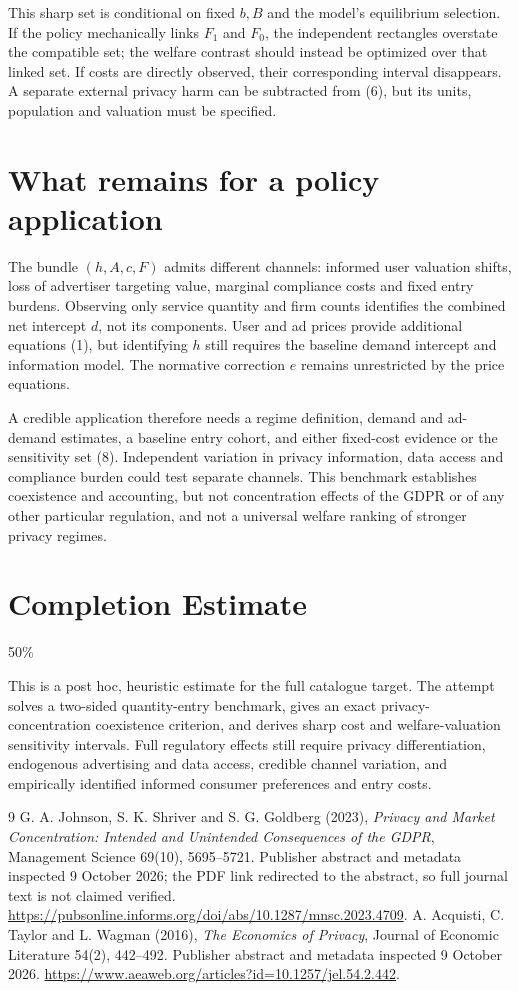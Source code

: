 \documentclass[11pt]{article}
\theoremstyle{remark}
\begin{document}
This sharp set is conditional on fixed $b,B$ and the model's equilibrium selection. If the policy mechanically links $F_1$ and $F_0$, the independent rectangles overstate the compatible set; the welfare contrast should instead be optimized over that linked set. If costs are directly observed, their corresponding interval disappears. A separate external privacy harm can be subtracted from (6), but its units, population and valuation must be specified.

\section{What remains for a policy application}
The bundle $(h,A,c,F)$ admits different channels: informed user valuation shifts, loss of advertiser targeting value, marginal compliance costs and fixed entry burdens. Observing only service quantity and firm counts identifies the combined net intercept $d$, not its components. User and ad prices provide additional equations (1), but identifying $h$ still requires the baseline demand intercept and information model. The normative correction $e$ remains unrestricted by the price equations.

A credible application therefore needs a regime definition, demand and ad-demand estimates, a baseline entry cohort, and either fixed-cost evidence or the sensitivity set (8). Independent variation in privacy information, data access and compliance burden could test separate channels. This benchmark establishes coexistence and accounting, but not concentration effects of the GDPR or of any other particular regulation, and not a universal welfare ranking of stronger privacy regimes.

\section{Completion Estimate}
50\%

This is a post hoc, heuristic estimate for the full catalogue target.
The attempt solves a two-sided quantity-entry benchmark, gives an exact privacy-concentration coexistence criterion, and derives sharp cost and welfare-valuation sensitivity intervals. Full regulatory effects still require privacy differentiation, endogenous advertising and data access, credible channel variation, and empirically identified informed consumer preferences and entry costs.

\begin{thebibliography}{9}
 G. A. Johnson, S. K. Shriver and S. G. Goldberg (2023), \emph{Privacy and Market Concentration: Intended and Unintended Consequences of the GDPR}, Management Science 69(10), 5695--5721. Publisher abstract and metadata inspected 9 October 2026; the PDF link redirected to the abstract, so full journal text is not claimed verified. \url{https://pubsonline.informs.org/doi/abs/10.1287/mnsc.2023.4709}.
 A. Acquisti, C. Taylor and L. Wagman (2016), \emph{The Economics of Privacy}, Journal of Economic Literature 54(2), 442--492. Publisher abstract and metadata inspected 9 October 2026. \url{https://www.aeaweb.org/articles?id=10.1257/jel.54.2.442}.
\end{thebibliography}
\end{document}
